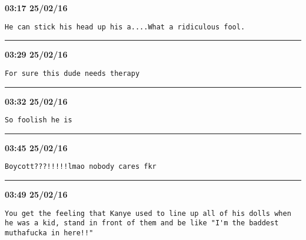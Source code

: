 \begin{adjustwidth}{0cm}{0cm}
\footnotesize \textbf{03:17 25/02/16}

\begin{lstlisting}[breaklines, breakatwhitespace, basicstyle=\small, frame=leftline]
He can stick his head up his a....What a ridiculous fool.
\end{lstlisting}
\end{adjustwidth}

\hrule%

\begin{adjustwidth}{0cm}{0cm}
\footnotesize \textbf{03:29 25/02/16}

\begin{lstlisting}[breaklines, breakatwhitespace, basicstyle=\small, frame=leftline]
For sure this dude needs therapy
\end{lstlisting}
\end{adjustwidth}

\hrule%

\begin{adjustwidth}{0cm}{0cm}
\footnotesize \textbf{03:32 25/02/16}

\begin{lstlisting}[breaklines, breakatwhitespace, basicstyle=\small, frame=leftline]
So foolish he is
\end{lstlisting}
\end{adjustwidth}

\hrule%

\begin{adjustwidth}{0cm}{0cm}
\footnotesize \textbf{03:45 25/02/16}

\begin{lstlisting}[breaklines, breakatwhitespace, basicstyle=\small, frame=leftline]
Boycott???!!!!!lmao nobody cares fkr
\end{lstlisting}
\end{adjustwidth}

\hrule%

\begin{adjustwidth}{0cm}{0cm}
\footnotesize \textbf{03:49 25/02/16}

\begin{lstlisting}[breaklines, breakatwhitespace, basicstyle=\small, frame=leftline]
You get the feeling that Kanye used to line up all of his dolls when he was a kid, stand in front of them and be like "I'm the baddest muthafucka in here!!"
\end{lstlisting}
\end{adjustwidth}

